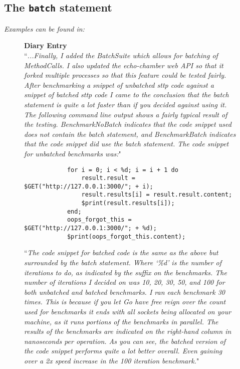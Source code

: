 \cprotect\subsection{The \verb|batch| statement}
\label{sec:eval-ast-nodes-batch}

\textit{Examples can be found in: }

\begin{figure}[H]
    \begin{center}
        \textbf{Diary Entry}\\[0.5em]
        ``\textit{...Finally, I added the BatchSuite which allows for batching of MethodCalls. I also updated the echo-chamber web API so that it forked multiple processes so that this feature could be tested fairly. After benchmarking a snippet of unbatched sttp code against a snippet of batched sttp code I came to the conclusion that the batch statement is quite a lot faster than if you decided against using it. The following command line output shows a fairly typical result of the testing. BenchmarkNoBatch indicates that the code snippet used does not contain the batch statement, and BenchmarkBatch indicates that the code snippet did use the batch statement. The code snippet for unbatched benchmarks was:}"
        \begin{verbatim}
            for i = 0; i < %d; i = i + 1 do
                result.result = $GET("http://127.0.0.1:3000/"; + i);
                result.results[i] = result.result.content;
                $print(result.results[i]);
            end;
            oops_forgot_this = $GET("http://127.0.0.1:3000/"; + %d);
            $print(oops_forgot_this.content);
        \end{verbatim}
        ``\textit{The code snippet for batched code is the same as the above but surrounded by the batch statement. Where `\%d' is the number of iterations to do, as indicated by the suffix on the benchmarks. The number of iterations I decided on was 10, 20, 30, 50, and 100 for both unbatched and batched benchmarks. I ran each benchmark 30 times. This is because if you let Go have free reign over the count used for benchmarks it ends with all sockets being allocated on your machine, as it runs portions of the benchmarks in parallel. The results of the benchmarks are indicated on the right-hand column in nanoseconds per operation. As you can see, the batched version of the code snippet performs quite a lot better overall. Even gaining over a 2x speed increase in the 100 iteration benchmark.}"

\end{center}
\end{figure}
